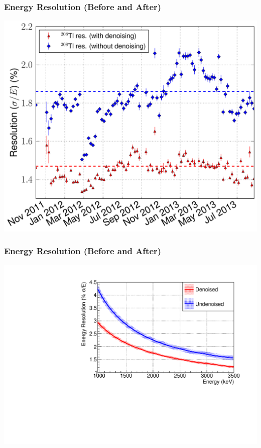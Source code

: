 \documentclass{beamer}
\begin{document}
\begin{frame}
\begin{center}
\frametitle{Energy Resolution (Before and After)}
\end{center}
\vspace{0.6cm}
\begin{center}
\includegraphics[keepaspectratio=true,width=.95\textwidth]{RotatedReso_denoised_compVsTime.pdf}
\end{center}
\end{frame}

\begin{frame}
\begin{center}
\frametitle{Energy Resolution (Before and After)}
\end{center}
\vspace{0.5cm}
\begin{center}
\includegraphics[keepaspectratio=true,width=\textwidth,clip=true,trim=0mm 0mm 10mm 10mm]{ResolutionFunctionComparison_relative.pdf}
\end{center}
\end{frame}
\end{document}
